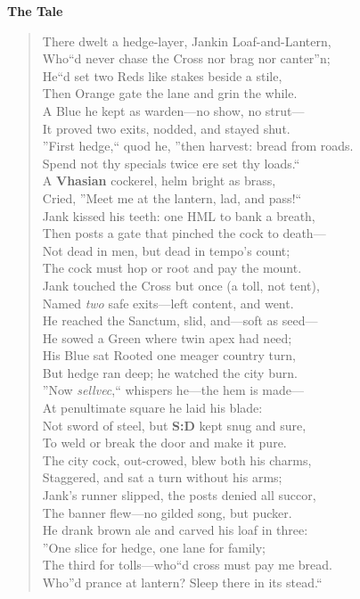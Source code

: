 \documentclass[11pt]{article}
\begin{document}
\noindent\textbf{The Tale}

\begin{verse}
There dwelt a hedge-layer, Jankin Loaf-and-Lantern,\\
Who``d never chase the Cross nor brag nor canter''n;\\
He``d set two Reds like stakes beside a stile,\\
Then Orange gate the lane and grin the while.\\
A Blue he kept as warden---no show, no strut---\\
It proved two exits, nodded, and stayed shut.\\
''First hedge,`` quod he, ''then harvest: bread from roads.\\
Spend not thy specials twice ere set thy loads.``\\[0.4em]

A \textbf{Vhasian} cockerel, helm bright as brass,\\
Cried, ''Meet me at the lantern, lad, and pass!``\\
Jank kissed his teeth: one \textsc{HML} to bank a breath,\\
Then posts a gate that pinched the cock to death---\\
Not dead in men, but dead in tempo's count;\\
The cock must hop or root and pay the mount.\\
Jank touched the Cross but once (a toll, not tent),\\
Named \emph{two} safe exits---left content, and went.\\[0.4em]

He reached the Sanctum, slid, and---soft as seed---\\
He sowed a Green where twin apex had need;\\
His Blue sat Rooted one meager country turn,\\
But hedge ran deep; he watched the city burn.\\
''Now \emph{sellvec},`` whispers he---the hem is made---\\
At penultimate square he laid his blade:\\
Not sword of steel, but \textbf{S:D} kept snug and sure,\\
To weld or break the door and make it pure.\\[0.4em]

The city cock, out-crowed, blew both his charms,\\
Staggered, and sat a turn without his arms;\\
Jank's runner slipped, the posts denied all succor,\\
The banner flew---no gilded song, but pucker.\\
He drank brown ale and carved his loaf in three:\\
''One slice for hedge, one lane for family;\\
The third for tolls---who``d cross must pay me bread.\\
Who''d prance at lantern? Sleep there in its stead.``
\end{verse}
\end{document}
